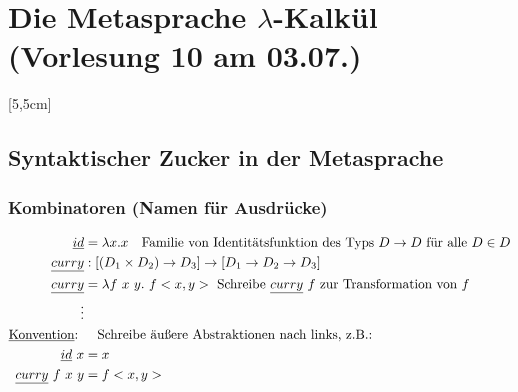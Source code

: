 \section{Die Metasprache $\lambda$-Kalkül \tiny (Vorlesung 10 am 03.07.)}
[5,5cm]

\subsection{Syntaktischer Zucker in der Metasprache}
\subsubsection{Kombinatoren (Namen für Ausdrücke)}
\begin{align*}
\underline{id} &= \lambda x.x \quad \text{Familie von Identitätsfunktion des Typs } D \rightarrow D \text{ für alle } D \in D\\
\underline{curry} &: [(D_1 \times D_2) \rightarrow D_3] \rightarrow [D_1 \rightarrow D_2 \rightarrow D_3]\\
\underline{curry} &= \lambda f \ x \ y. \ f <x,y> \text{ Schreibe } \underline{curry} \ f \text{ zur Transformation von } f\\
\vdots \\
\text{\underline{Konvention}: } &\quad \text{Schreibe äußere Abstraktionen nach links, z.B.:}\\
\underline{id} \ x & = x\\
\underline{curry} \ f \ x \ y &= f<x,y>\\
\end{align*}

